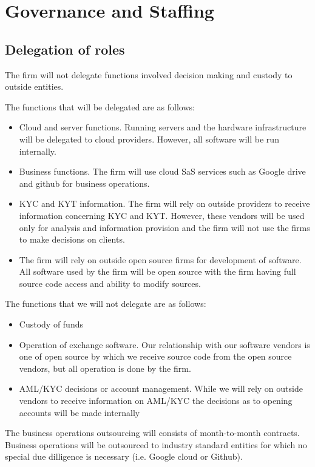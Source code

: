 \chapter{Governance and Staffing}

\section{Delegation of roles}

The firm will not delegate functions involved decision making and
custody to outside entities.

The functions that will be delegated are as follows:
\begin{itemize}
  \item Cloud and server functions.  Running servers and the hardware
    infrastructure will be delegated to cloud providers.  However, all
    software will be run internally.
 \item Business functions.  The firm will use cloud SaS services such
   as Google drive and github for business operations.
 \item KYC and KYT information.  The firm will rely on outside
   providers to receive information concerning KYC and KYT.  However,
   these vendors will be used only for analysis and information
   provision and the firm will not use the firms to make decisions on
   clients.
\item The firm will rely on outside open source firms for development
  of software.  All software used by the firm will be open source with
  the firm having full source code access and ability to modify sources.
\end{itemize}

The functions that we will not delegate are as follows:
\begin{itemize}
\item Custody of funds
  \item Operation of exchange software.  Our relationship with our
    software vendors is one of open source by which we receive source
    code from the open source vendors, but all operation is done by
    the firm.
 \item AML/KYC decisions or account management.  While we will rely on
   outside vendors to receive information on AML/KYC the decisions as
   to opening accounts will be made internally
\end{itemize}

The business operations outsourcing will consists of month-to-month
contracts.  Business operations will be outsourced to industry
standard entities for which no special due dilligence is necessary
(i.e. Google cloud or Github).

